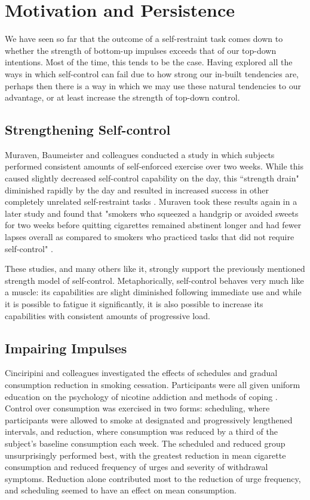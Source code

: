 \section{Motivation and Persistence}
We have seen so far that the outcome of a self-restraint task comes down to whether the strength of bottom-up impulses exceeds that of our top-down intentions. Most of the time, this tends to be the case. Having explored all the ways in which self-control can fail due to how strong our in-built tendencies are, perhaps then there is a way in which we may use these natural tendencies to our advantage, or at least increase the strength of top-down control.

\subsection{Strengthening Self-control}
Muraven, Baumeister and colleagues conducted a study in which subjects performed consistent amounts of self-enforced exercise over two weeks. While this caused slightly decreased self-control capability on the day, this ``strength drain" diminished rapidly by the day and resulted in increased success in other completely unrelated self-restraint tasks \cite{muraven1999longitudinal}. Muraven took these results again in a later study and found that "smokers who squeezed a handgrip or avoided sweets for two weeks before quitting cigarettes remained abstinent longer and had fewer lapses overall as compared to smokers who practiced tasks that did not require self-control" \cite{muraven2010practicing}.

These studies, and many others like it, strongly support the previously mentioned strength model of self-control. Metaphorically, self-control behaves very much like a muscle: its capabilities are slight diminished following immediate use and while it is possible to fatigue it significantly, it is also possible to increase its capabilities with consistent amounts of progressive load.

\subsection{Impairing Impulses}
Cinciripini and colleagues investigated the effects of schedules and gradual consumption reduction in smoking cessation. Participants were all given uniform education on the psychology of nicotine addiction and methods of coping \cite{cinciripini1995effects}. Control over consumption was exercised in two forms: scheduling, where participants were allowed to smoke at designated and progressively lengthened intervals, and reduction, where consumption was reduced by a third of the subject's baseline consumption each week. The scheduled and reduced group unsurprisingly performed best, with the greatest reduction in mean cigarette consumption and reduced frequency of urges and severity of withdrawal symptoms. Reduction alone contributed most to the reduction of urge frequency, and scheduling seemed to have an effect on mean consumption.

